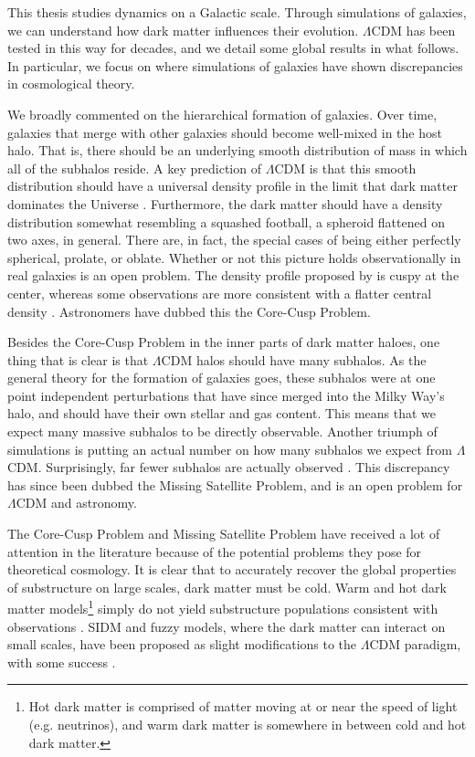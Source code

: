 This thesis studies dynamics on a Galactic scale. Through simulations of galaxies, we can understand how dark matter influences their evolution. $\Lambda$CDM has been tested in this way for decades, and we detail some global results in what follows. In particular, we focus on where simulations of galaxies have shown discrepancies in cosmological theory.

We broadly commented on the hierarchical formation of galaxies. Over time, galaxies that merge with other galaxies should become well-mixed in the host halo. That is, there should be an underlying smooth distribution of mass in which all of the subhalos reside. A key prediction of $\Lambda$CDM is that this smooth distribution should have a universal density profile in the limit that dark matter dominates the Universe \citep{nfw}. Furthermore, the dark matter should have a density distribution somewhat resembling a squashed football, a spheroid flattened on two axes, in general. There are, in fact, the special cases of being either perfectly spherical, prolate, or oblate. Whether or not this picture holds observationally in real galaxies is an open problem. The density profile proposed by \citet{nfw} is cuspy at the center, whereas some observations are more consistent with a flatter central density \citep{de_blok_core_cusp}. Astronomers have dubbed this the Core-Cusp Problem. 

Besides the Core-Cusp Problem in the inner parts of dark matter haloes, one thing that is clear is that $\Lambda$CDM halos should have many subhalos. As the general theory for the formation of galaxies goes, these subhalos were at one point independent perturbations that have since merged into the Milky Way's halo, and should have their own stellar and gas content. This means that we expect many massive subhalos to be directly observable. Another triumph of simulations is putting an actual number on how many subhalos we expect from $\Lambda$CDM. Surprisingly, far fewer subhalos are actually observed \citep{mooresubhalos, Klypin1999, springel2008}. This discrepancy has since been dubbed the Missing Satellite Problem, and is an open problem for $\Lambda$CDM and astronomy.


The Core-Cusp Problem and Missing Satellite Problem have received a lot of attention in the literature because of the potential problems they pose for theoretical cosmology. It is clear that to accurately recover the global properties of substructure on large scales, dark matter must be cold. Warm and hot dark matter models\footnote{Hot dark matter is comprised of matter moving at or near the speed of light (e.g. neutrinos), and warm dark matter is somewhere in between cold and hot dark matter.} simply do not yield substructure populations consistent with observations \citep[for example]{alternate_dm}. SIDM and fuzzy models, where the dark matter can interact on small scales, have been proposed as slight modifications to the $\Lambda$CDM paradigm, with some success \citep[for example]{hui_2017}. 

